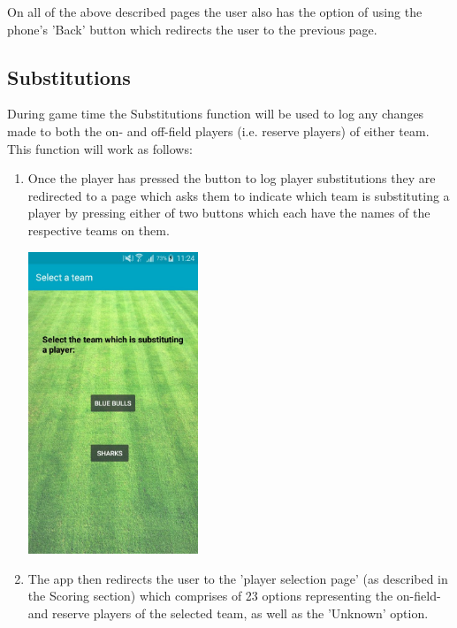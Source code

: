 \documentclass[hidelinks,a4paper,12pt]{article}
\begin{document}
	On all of the above described pages the user also has the option of using the phone's  'Back' button which redirects the user to the previous page.

	\subsection{Substitutions}
		During game time the Substitutions function will be used to log any changes made to both the on- and off-field players (i.e. reserve players) of either team. This function will work as follows:
		\begin{enumerate}
			\item Once the player has pressed the button to log player substitutions they are redirected to a page which asks them to indicate which team is substituting a player by pressing either of two buttons which each have the names of the respective teams on them.
			\begin{center}
  				 \includegraphics[width=0.4\textwidth] {./images/choose_substitute.jpg}\\[0.4cm]
			\end{center}
			\item The app then redirects the user to the 'player selection page' (as described in the Scoring section) which comprises of 23 options representing the on-field- and reserve players of the selected team, as well as the 'Unknown' option.
			\begin{center}

\end{center}
\end{enumerate}
\end{document}

